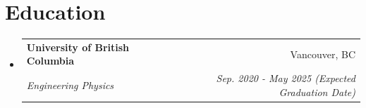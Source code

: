 \documentclass[letterpaper,11pt]{article}
\makeatletter
\newcommand{\resumeSubheading}[4]{
  \vspace{-2pt}\item
    \begin{tabular*}{0.97\textwidth}[t]{l@{\extracolsep{\fill}}r}
      \textbf{#1} & #2 \\
      \textit{\small#3} & \textit{\small #4} \\
    \end{tabular*}\vspace{-7pt}
}
\newcommand{\resumeSubHeadingListStart}{\begin{itemize}[leftmargin=0.15in, label={}]}
\newcommand{\resumeSubHeadingListEnd}{\end{itemize}}
\makeatother
\begin{document}
\vspace{-7mm}

\section{Education}
  \resumeSubHeadingListStart
    \resumeSubheading
      {University of British Columbia}{Vancouver, BC}
      {Engineering Physics}{Sep. 2020 - May 2025 (Expected Graduation Date)}
  \resumeSubHeadingListEnd

\vspace{-3mm}

\end{document}
